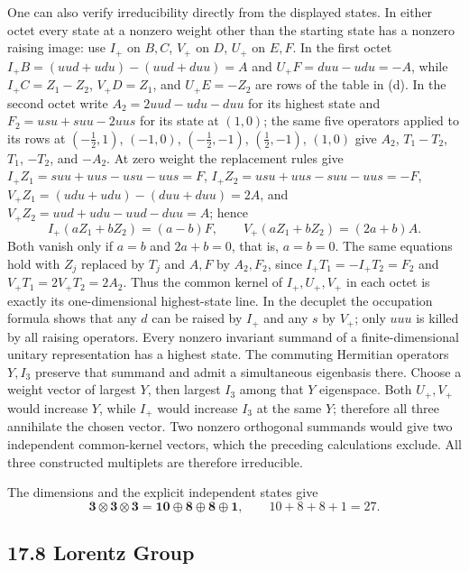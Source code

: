 One can also verify irreducibility directly from the displayed
states. In either octet every state at a nonzero weight other than
the starting state has a nonzero raising image: use $I_+$ on $B,C$,
$V_+$ on $D$, $U_+$ on $E,F$. In the first octet
$I_+B=(uud+udu)-(uud+duu)=A$ and $U_+F=duu-udu=-A$, while
$I_+C=Z_1-Z_2$, $V_+D=Z_1$, and $U_+E=-Z_2$ are rows of the table
in (d). In the second octet write $A_2=2uud-udu-duu$ for its highest
state and $F_2=usu+suu-2uus$ for its state at $(1,0)$; the same five
operators applied to its rows at $(-\tfrac12,1)$, $(-1,0)$,
$(-\tfrac12,-1)$, $(\tfrac12,-1)$, $(1,0)$ give $A_2$, $T_1-T_2$,
$T_1$, $-T_2$, and $-A_2$. At zero weight the replacement rules give
$I_+Z_1=suu+uus-usu-uus=F$, $I_+Z_2=usu+uus-suu-uus=-F$,
$V_+Z_1=(udu+udu)-(duu+duu)=2A$, and
$V_+Z_2=uud+udu-uud-duu=A$; hence
\[
I_+(aZ_1+bZ_2)=(a-b)F,\qquad
V_+(aZ_1+bZ_2)=(2a+b)A.
\]
Both vanish only if $a=b$ and $2a+b=0$, that is, $a=b=0$.
The same equations hold with
$Z_j$ replaced by $T_j$ and $A,F$ by $A_2,F_2$, since
$I_+T_1=-I_+T_2=F_2$ and $V_+T_1=2V_+T_2=2A_2$.
Thus the common kernel of $I_+,U_+,V_+$ in each octet is exactly
its one-dimensional highest-state line. In the decuplet the
occupation formula shows that any $d$ can be raised by $I_+$
and any $s$ by $V_+$; only $uuu$ is killed by all raising operators.
Every nonzero invariant summand of a finite-dimensional unitary
representation has a highest state. The commuting Hermitian
operators $Y,I_3$ preserve that summand and admit a simultaneous
eigenbasis there. Choose a weight vector of largest $Y$, then
largest $I_3$ among that $Y$ eigenspace. Both $U_+,V_+$ would
increase $Y$, while $I_+$ would increase $I_3$ at the same $Y$;
therefore all three annihilate the chosen vector. Two nonzero orthogonal summands would give
two independent common-kernel vectors, which the preceding
calculations exclude. All three constructed multiplets are
therefore irreducible.

The dimensions and the explicit independent states give
\[
\boxed{\mathbf3\otimes\mathbf3\otimes\mathbf3
=\mathbf{10}\oplus\mathbf8\oplus\mathbf8\oplus\mathbf1},
\qquad 10+8+8+1=27.
\]

\subsection*{17.8 Lorentz Group}

